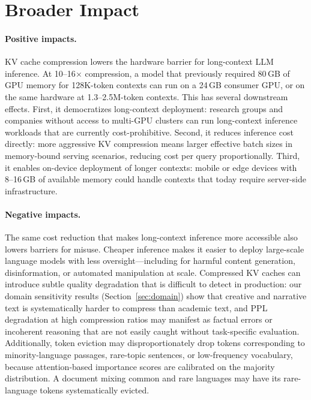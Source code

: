 \documentclass{article}
\begin{document}
\section*{Broader Impact}
\label{sec:broader_impact}

\paragraph{Positive impacts.}
KV cache compression lowers the hardware barrier for long-context LLM inference.
At 10--16$\times$ compression, a model that previously required 80\,GB of GPU
memory for 128K-token contexts can run on a 24\,GB consumer GPU, or on the same
hardware at 1.3--2.5M-token contexts. This has several downstream effects.
First, it democratizes long-context deployment: research groups and companies
without access to multi-GPU clusters can run long-context inference workloads
that are currently cost-prohibitive. Second, it reduces inference cost directly:
more aggressive KV compression means larger effective batch sizes in
memory-bound serving scenarios, reducing cost per query proportionally.
Third, it enables on-device deployment of longer contexts: mobile or edge
devices with 8--16\,GB of available memory could handle contexts that today
require server-side infrastructure.

\paragraph{Negative impacts.}
The same cost reduction that makes long-context inference more accessible
also lowers barriers for misuse. Cheaper inference makes it easier to deploy
large-scale language models with less oversight---including for harmful
content generation, disinformation, or automated manipulation at scale.
Compressed KV caches can introduce subtle quality degradation that is
difficult to detect in production: our domain sensitivity results
(Section~\ref{sec:domain}) show that creative and narrative text is
systematically harder to compress than academic text, and PPL degradation
at high compression ratios may manifest as factual errors or incoherent
reasoning that are not easily caught without task-specific evaluation.
Additionally, token eviction may disproportionately drop tokens corresponding
to minority-language passages, rare-topic sentences, or low-frequency
vocabulary, because attention-based importance scores are calibrated
on the majority distribution. A document mixing common and rare languages
may have its rare-language tokens systematically evicted.
\end{document}
